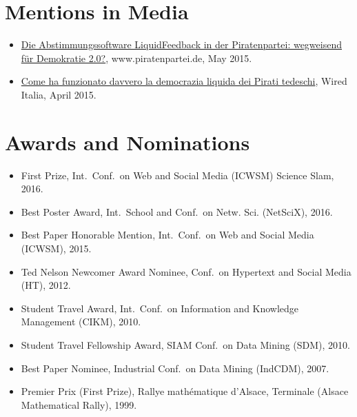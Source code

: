 \documentclass[line,margin]{res}
\begin{document}
\begin{resume}
\section{Mentions in Media}
\begin{itemize}
  \item
    \href{https://www.piratenpartei.de/2015/05/31/die-abstimmungssoftware-liquidfeedback-der-piratenpartei-wegweisend-fuer-demokratie-2-0/}{Die
      Abstimmungssoftware LiquidFeedback in der Piratenpartei:
      wegweisend für Demokratie 2.0?}, www.piratenpartei.de, May 2015. 
\item
  \href{http://www.wired.it/attualita/2015/04/01/come-funzionato-davvero-democrazia-liquida-dei-pirati-tedeschi/}{Come
    ha funzionato davvero la democrazia liquida dei Pirati tedeschi},
  Wired Italia, April 2015. 
\end{itemize}

\section{Awards and Nominations}
\begin{itemize}
  \item First Prize, Int.\ Conf.\ on Web and Social Media (ICWSM) Science Slam, 2016.
  \item Best Poster Award, Int.\ School and Conf.\ on Netw. Sci.
    (NetSciX), 2016. 
  \item Best Paper Honorable Mention, Int.\ Conf.\ on Web and Social
    Media (ICWSM), 2015.  
  \item Ted Nelson Newcomer Award Nominee, Conf.\ on Hypertext and
    Social Media (HT), 2012.   
  \item Student Travel Award, Int.\ Conf.\ on Information and Knowledge
    Management (CIKM), 2010. 
  \item Student Travel Fellowship Award, SIAM Conf.\ on Data Mining (SDM),
    2010.  
  \item Best Paper Nominee, Industrial Conf.\ on Data Mining (IndCDM), 2007.    
  \item Premier Prix (First Prize), Rallye mathématique d'Alsace, Terminale (Alsace Mathematical Rally), 1999. 
\end{itemize}


\end{resume}
\end{document}

